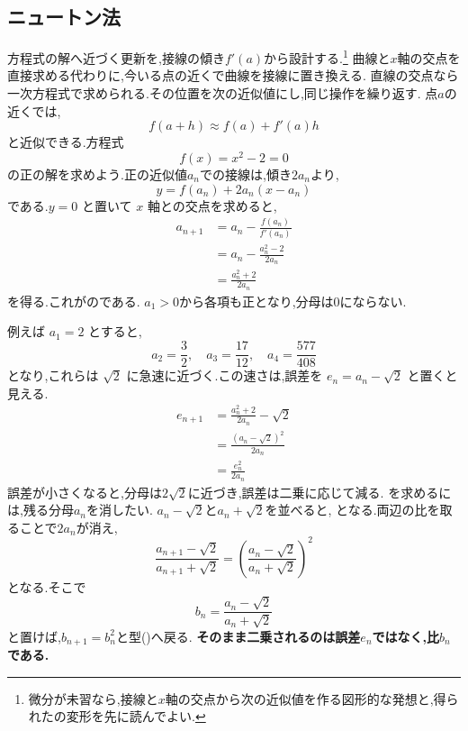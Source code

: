 \subsection{ニュートン法}\label{節：ニュートン法}

方程式の解へ近づく更新を,接線の傾き$f'(a)$から設計する.\footnote{微分が未習なら,接線と$x$軸の交点から次の近似値を作る図形的な発想と,得られたの変形を先に読んでよい.}
曲線と$x$軸の交点を直接求める代わりに,今いる点の近くで曲線を接線に置き換える.
直線の交点なら一次方程式で求められる.その位置を次の近似値にし,同じ操作を繰り返す.
点$a$の近くでは,
\[
  f(a+h) \approx f(a)+f'(a)h
\]
と近似できる.方程式
\[
  f(x)=x^2-2=0
\]
の正の解を求めよう.正の近似値$a_n$での接線は,傾き$2a_n$より,
\[
  y=f(a_n)+2a_n(x-a_n)
\]
である.$y=0$ と置いて $x$ 軸との交点を求めると,
\begin{align*}
  a_{n+1}
  &=a_n-\frac{f(a_n)}{f'(a_n)}\\
  &=a_n-\frac{a_n^2-2}{2a_n}\\
  &=\frac{a_n^2+2}{2a_n}
\end{align*}
を得る.これがのである.
$a_1>0$から各項も正となり,分母は0にならない.
\BookFigNewton

例えば $a_1=2$ とすると,
\[
  a_2=\frac{3}{2},
  \quad
  a_3=\frac{17}{12},
  \quad
  a_4=\frac{577}{408}
\]
となり,これらは $\sqrt{2}$ に急速に近づく.この速さは,誤差を
$e_n=a_n-\sqrt{2}$ と置くと見える.
\begin{align*}
  e_{n+1}
  &=\frac{a_n^2+2}{2a_n}-\sqrt{2}\\
  &=\frac{(a_n-\sqrt{2})^2}{2a_n}\\
  &=\frac{e_n^2}{2a_n}
\end{align*}
誤差が小さくなると,分母は$2\sqrt2$に近づき,誤差は二乗に応じて減る.
を求めるには,残る分母$a_n$を消したい.
$a_n-\sqrt2$と$a_n+\sqrt2$を並べると,
\BookMathLayout{
  \[
    \begin{aligned}
      a_{n+1}-\sqrt2&=\frac{(a_n-\sqrt2)^2}{2a_n},\\
      a_{n+1}+\sqrt2&=\frac{(a_n+\sqrt2)^2}{2a_n}
    \end{aligned}
  \]
}{
  \[
    \begin{aligned}
      a_{n+1}-\sqrt2&=\frac{(a_n-\sqrt2)^2}{2a_n},\\
      a_{n+1}+\sqrt2&=\frac{(a_n+\sqrt2)^2}{2a_n}
    \end{aligned}
  \]
}
となる.両辺の比を取ることで$2a_n$が消え,
\[
  \frac{a_{n+1}-\sqrt{2}}{a_{n+1}+\sqrt{2}}
  =\left(\frac{a_n-\sqrt{2}}{a_n+\sqrt{2}}\right)^{2}
\]
となる.そこで
\[
  b_n=\frac{a_n-\sqrt{2}}{a_n+\sqrt{2}}
\]
と置けば,$b_{n+1}=b_n^2$と型()へ戻る.
\textbf{そのまま二乗されるのは誤差$e_n$ではなく,比$b_n$である.}


